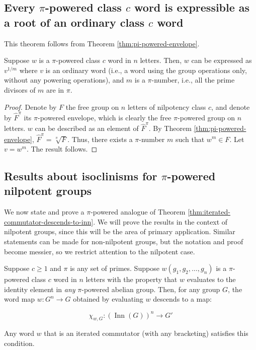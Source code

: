 \subsection{Every $\pi$-powered class $c$ word is expressible as a root of an ordinary class $c$ word}

This theorem follows from Theorem \ref{thm:pi-powered-envelope}.

\begin{theorem}\label{thm:root-outside}
  Suppose $w$ is a $\pi$-powered class $c$ word in $n$ letters. Then,
  $w$ can be expressed as $v^{1/m}$ where $v$ is an ordinary word
  (i.e., a word using the group operations only, without any powering
  operations), and $m$ is a $\pi$-number, i.e., all the prime divisors
  of $m$ are in $\pi$.
\end{theorem}

\begin{proof}
  Denote by $F$ the free group on $n$ letters of nilpotency class $c$,
  and denote by $\hat{F}^\pi$ its $\pi$-powered envelope, which is
  clearly the free $\pi$-powered group on $n$ letters. $w$ can be
  described as an element of $\hat{F}^\pi$. By Theorem
  \ref{thm:pi-powered-envelope}, $\hat{F}^\pi = \sqrt[\pi]{F}$. Thus,
  there exists a $\pi$-number $m$ such that $w^m \in F$. Let $v =
  w^m$. The result follows.
\end{proof}

\subsection{Results about isoclinisms for $\pi$-powered nilpotent groups}\label{sec:pi-powered-isoclinism-results}

We now state and prove a $\pi$-powered analogue of Theorem
\ref{thm:iterated-commutator-descends-to-inn}. We will prove the
results in the context of nilpotent groups, since this will be the
area of primary application. Similar statements can be made for
non-nilpotent groups, but the notation and proof become messier, so we
restrict attention to the nilpotent case.

\begin{theorem}\label{thm:iterated-commutator-descends-to-inn-pi-powered}
  Suppose $c \ge 1$ and $\pi$ is any set of primes. Suppose
  $w(g_1,g_2,\dots,g_n)$ is a $\pi$-powered class $c$ word in $n$
  letters with the property that $w$ evaluates to the identity element
  in {\em any} $\pi$-powered abelian group. Then, for any group $G$,
  the word map $w:G^n \to G$ obtained by evaluating $w$ descends to a
  map:

  $$\chi_{w,G}: (\operatorname{Inn}(G))^n  \to G'$$

  Any word $w$ that is an iterated commutator (with any bracketing)
  satisfies this condition.
\end{theorem}


